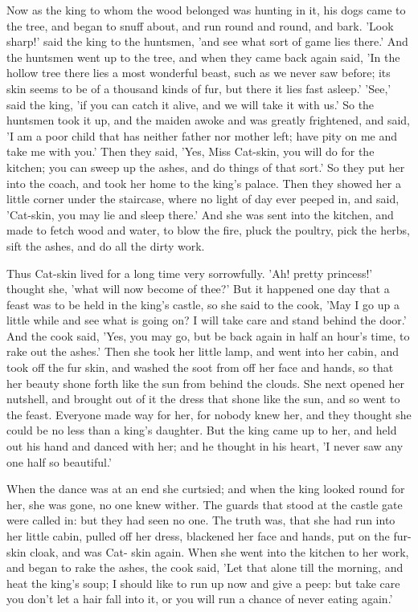 \documentclass[12pt]{book}
\begin{document}
Now as the king to whom the wood belonged was hunting in it, his dogs
came to the tree, and began to snuff about, and run round and round,
and bark. 'Look sharp!' said the king to the huntsmen, 'and see what
sort of game lies there.' And the huntsmen went up to the tree, and
when they came back again said, 'In the hollow tree there lies a most
wonderful beast, such as we never saw before; its skin seems to be of
a thousand kinds of fur, but there it lies fast asleep.' 'See,' said
the king, 'if you can catch it alive, and we will take it with us.' So
the huntsmen took it up, and the maiden awoke and was greatly
frightened, and said, 'I am a poor child that has neither father nor
mother left; have pity on me and take me with you.' Then they said,
'Yes, Miss Cat-skin, you will do for the kitchen; you can sweep up the
ashes, and do things of that sort.' So they put her into the coach,
and took her home to the king's palace. Then they showed her a little
corner under the staircase, where no light of day ever peeped in, and
said, 'Cat-skin, you may lie and sleep there.' And she was sent into
the kitchen, and made to fetch wood and water, to blow the fire, pluck
the poultry, pick the herbs, sift the ashes, and do all the dirty
work.

Thus Cat-skin lived for a long time very sorrowfully. 'Ah! pretty
princess!' thought she, 'what will now become of thee?' But it
happened one day that a feast was to be held in the king's castle, so
she said to the cook, 'May I go up a little while and see what is
going on? I will take care and stand behind the door.' And the cook
said, 'Yes, you may go, but be back again in half an hour's time, to
rake out the ashes.' Then she took her little lamp, and went into her
cabin, and took off the fur skin, and washed the soot from off her
face and hands, so that her beauty shone forth like the sun from
behind the clouds. She next opened her nutshell, and brought out of it
the dress that shone like the sun, and so went to the feast. Everyone
made way for her, for nobody knew her, and they thought she could be
no less than a king's daughter. But the king came up to her, and held
out his hand and danced with her; and he thought in his heart, 'I
never saw any one half so beautiful.'

When the dance was at an end she curtsied; and when the king looked
round for her, she was gone, no one knew wither. The guards that stood
at the castle gate were called in: but they had seen no one. The truth
was, that she had run into her little cabin, pulled off her dress,
blackened her face and hands, put on the fur-skin cloak, and was Cat-
skin again. When she went into the kitchen to her work, and began to
rake the ashes, the cook said, 'Let that alone till the morning, and
heat the king's soup; I should like to run up now and give a peep: but
take care you don't let a hair fall into it, or you will run a chance
of never eating again.'
\end{document}
